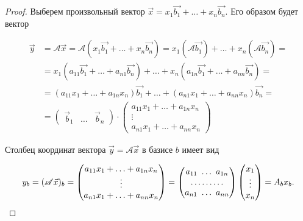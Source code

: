 \begin{proof}
    Выберем произвольный вектор $\vec{x} = x_1\vec{b_1} + \ldots + x_n\vec{b_n}$. Его образом будет вектор

    \begin{align*}
        \vec{y} &= \mathscr{A}\vec{x} =  \mathscr{A}(x_1\vec{b_1} + \ldots + x_n\vec{b_n}) = x_1(\mathscr{A}\vec{b_1}) + \ldots + x_n(\mathscr{A}\vec{b_n}) = \\
        &= x_1(a_{11}\vec{b_1} + \ldots + a_{n1}\vec{b_n}) + \ldots + x_n(a_{1n}\vec{b_1} + \ldots + a_{nn}\vec{b_n}) = \\
        &= (a_{11}x_1 + \ldots + a_{1n}x_n)\vec{b_1} + \ldots + (a_{n1}x_1 + \ldots + a_{nn}x_n)\vec{b_n} = \\
        &= \begin{pmatrix}
            \vec{b}_1 & \ldots & \vec{b}_n
        \end{pmatrix} \cdot \begin{pmatrix} 
            a_{11}x_1 + \ldots + a_{1n}x_n \\
            \vdots \\
            a_{n1}x_1 + \ldots + a_{nn}x_n
        \end{pmatrix}
    \end{align*}

    Столбец координат вектора $\vec{y} = \mathscr{A}\vec{x}$ в базисе $b$ имеет вид

    \begin{equation*}
        y_b = (\mathscr{A}\vec{x})_b = \begin{pmatrix} 
            a_{11}x_1 + \ldots + a_{1n}x_n \\
            \vdots \\
            a_{n1}x_1 + \ldots + a_{nn}x_n
        \end{pmatrix} =
        \begin{pmatrix} 
            a_{11} \thinspace \thinspace \ldots \thinspace \thinspace a_{1n} \\
            \ldots \ldots \ldots \\
            a_{n1} \thinspace \thinspace \ldots \thinspace \thinspace a_{nn}
        \end{pmatrix}
        \begin{pmatrix} 
            x_1 \\
            \vdots \\
            x_n
        \end{pmatrix} = A_bx_b
    .\end{equation*}
\end{proof}


